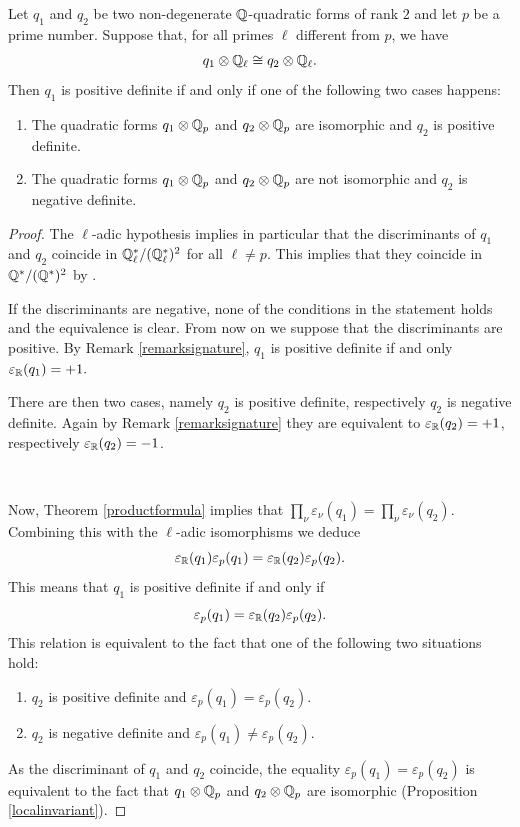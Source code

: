 \documentclass[11pt]{amsart}
\begin{document}
\begin{corollary}\label{signaturetop}
Let $q_1$ and $q_2$  be two non-degenerate $\mathbb{Q}$-quadratic forms of rank $2$ and let $p$ be a prime number. Suppose that, for all primes $\ell$ different from $p$, we have
\[q_1 \otimes \mathbb{Q}_\ell \cong q_2 \otimes \mathbb{Q}_\ell.\]
Then $q_1$ is positive definite if and only if one of the following two cases happens:
\begin{enumerate}
\item  The quadratic forms $q_1\otimes \mathbb{Q}_p$ and $q_2\otimes \mathbb{Q}_p$ are isomorphic and $q_2$ is positive definite.
\item  The quadratic forms $q_1\otimes \mathbb{Q}_p$ and $q_2\otimes \mathbb{Q}_p$ are not isomorphic and $q_2$ is negative definite.
\end{enumerate}
\end{corollary}
\begin{proof}

The $\ell$-adic hypothesis implies in particular that the discriminants of $q_1$ and $q_2$ coincide in $ \mathbb{Q}_\ell^*/(\mathbb{Q}_\ell^*)^2$ 
 for all   $\ell\neq p$. This implies that they coincide in $ \mathbb{Q}^*/(\mathbb{Q}^*)^2$
by \cite[Theorem 3 in 5.2]{Ireland}.

If the discriminants are negative, none of the conditions in the statement holds and the equivalence is clear. From now on we suppose that the discriminants are   positive. By Remark \ref{remarksignature}, $q_1$ is positive definite if and only $\varepsilon_{\mathbb{R}}(q_1)=+1.$




There are then two cases, namely $q_2$ is positive definite, respectively $q_2$ is negative definite. Again by Remark \ref{remarksignature} they are equivalent to $\varepsilon_{\mathbb{R}}(q_2)=+1$, respectively $\varepsilon_{\mathbb{R}}(q_2)=-1$. 

\


Now, Theorem \ref{productformula} implies that
$\prod_\nu  \varepsilon_\nu(q_1)=\prod_\nu  \varepsilon_\nu(q_2).$
Combining this with the $\ell$-adic isomorphisms we deduce
\[\varepsilon_{\mathbb{R}}(q_1)\varepsilon_p(q_1)=\varepsilon_{\mathbb{R}}(q_2)\varepsilon_p(q_2).\] This means that $q_1$ is positive definite if and only if
 \[\varepsilon_p(q_1)=\varepsilon_{\mathbb{R}}(q_2)\varepsilon_p(q_2).\]
 This relation is equivalent to the fact that one of the following two situations hold:
 \begin{enumerate}
\item   $q_2$ is positive definite and $\varepsilon_p(q_1)=\varepsilon_p(q_2).$
\item  $q_2$ is negative definite and $\varepsilon_p(q_1)\neq\varepsilon_p(q_2).$
\end{enumerate}
As the discriminant of $q_1$ and $q_2$ coincide, the equality $\varepsilon_p(q_1)=\varepsilon_p(q_2)$ is equivalent to the fact that $q_1\otimes \mathbb{Q}_p$ and $q_2\otimes \mathbb{Q}_p$ are isomorphic (Proposition \ref{localinvariant}).
\end{proof}
\end{document}
